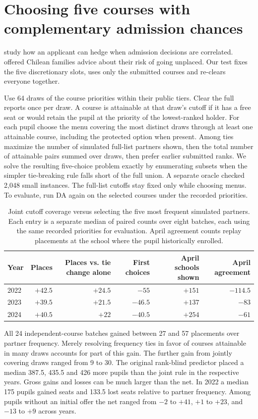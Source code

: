 \section{Choosing five courses with complementary admission chances}\label{sec:portfolios}
\citet{alishorrer} study how an applicant can hedge when admission decisions are correlated. \citet{smartplatforms} offered Chilean families advice about their risk of going unplaced. Our test fixes the five discretionary slots, uses only the submitted courses and re-clears everyone together.

Use 64 draws of the course priorities within their public tiers. Clear the full reports once per draw. A course is attainable at that draw's cutoff if it has a free seat or would retain the pupil at the priority of the lowest-ranked holder. For each pupil choose the menu covering the most distinct draws through at least one attainable course, including the protected option when present. Among ties maximize the number of simulated full-list partners shown, then the total number of attainable pairs summed over draws, then prefer earlier submitted ranks. We solve the resulting five-choice problem exactly by enumerating subsets when the simpler tie-breaking rule falls short of the full union. A separate oracle checked 2,048 small instances. The full-list cutoffs stay fixed only while choosing menus. To evaluate, run DA again on the selected courses under the recorded priorities.

\begin{table}[ht]\centering\small
\caption{Joint cutoff coverage versus selecting the five most frequent simulated partners. Each entry is a separate median of paired counts over eight batches, each using the same recorded priorities for evaluation. April agreement counts replay placements at the school where the pupil historically enrolled.}\label{tab:portfolio-design}
\begin{tabular}{@{}lrrrrr@{}}\toprule
Year & Places & Places vs. tie change alone & First choices & April schools shown & April agreement\\\midrule
2022 & $+42.5$ & $+24.5$ & $-55$ & $+151$ & $-114.5$\\
2023 & $+39.5$ & $+21.5$ & $-46.5$ & $+137$ & $-83$\\
2024 & $+40.5$ & $+22$ & $-40.5$ & $+254$ & $-61$\\\bottomrule
\end{tabular}
\end{table}

All 24 independent-course batches gained between 27 and 57 placements over partner frequency. Merely resolving frequency ties in favor of courses attainable in many draws accounts for part of this gain. The further gain from jointly covering draws ranged from 9 to 30. The original rank-blind predictor placed a median 387.5, 435.5 and 426 more pupils than the joint rule in the respective years. Gross gains and losses can be much larger than the net. In 2022 a median 175 pupils gained seats and 133.5 lost seats relative to partner frequency. Among pupils without an initial offer the net ranged from $-2$ to $+41$, $+1$ to $+23$, and $-13$ to $+9$ across years.

